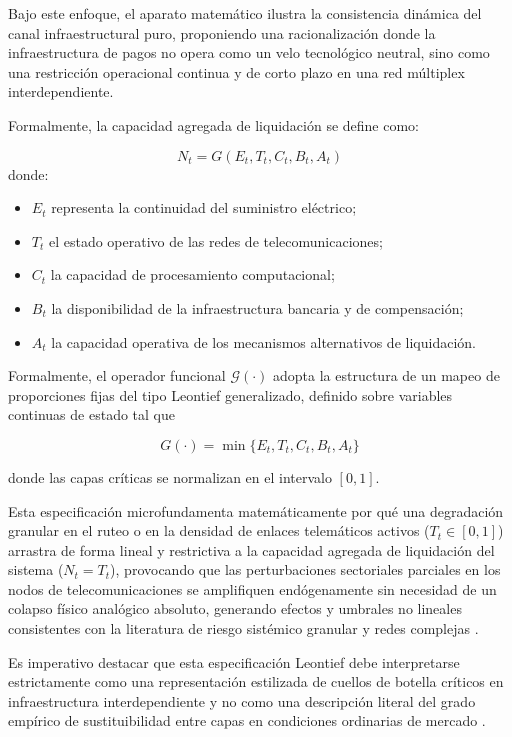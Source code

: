 Bajo este enfoque, el aparato matem\'atico ilustra la consistencia din\'amica del canal infraestructural puro, proponiendo una racionalizaci\'on donde la infraestructura de pagos no opera como un velo tecnol\'ogico neutral, sino como una restricci\'on operacional continua y de corto plazo en una red m\'ultiplex interdependiente.

Formalmente, la capacidad agregada de liquidaci\'on se define como:

\begin{equation}
\label{eq:Nt}
N_t = G(E_t, T_t, C_t, B_t, A_t)
\end{equation}
donde:
\begin{itemize}
    \item $E_t$ representa la continuidad del suministro el\'ectrico;
    \item $T_t$ el estado operativo de las redes de telecomunicaciones;
    \item $C_t$ la capacidad de procesamiento computacional;
    \item $B_t$ la disponibilidad de la infraestructura bancaria y de compensaci\'on;
    \item $A_t$ la capacidad operativa de los mecanismos alternativos de liquidaci\'on.
\end{itemize}

Formalmente, el operador funcional $\mathcal{G}(\cdot)$ adopta la estructura de un mapeo de proporciones fijas del tipo Leontief generalizado, definido sobre variables continuas de estado tal que 

\begin{equation}
G(\cdot) = \min\{E_t, T_t, C_t, B_t, A_t\}
\end{equation}

donde las capas cr\'iticas se normalizan en el intervalo $[0,1]$. 

Esta especificaci\'on microfundamenta matem\'aticamente por qu\'e una degradaci\'on granular en el ruteo o en la densidad de enlaces telem\'aticos activos ($T_t \in [0,1]$) arrastra de forma lineal y restrictiva a la capacidad agregada de liquidaci\'on del sistema ($N_t = T_t$), provocando que las perturbaciones sectoriales parciales en los nodos de telecomunicaciones se amplifiquen end\'ogenamente sin necesidad de un colapso f\'isico anal\'ogico absoluto, generando efectos y umbrales no lineales consistentes con la literatura de riesgo sist\'emico granular y redes complejas \citep{acemoglu2012network, panetta2025systemic}. 

Es imperativo destacar que esta especificaci\'on Leontief debe interpretarse estrictamente como una representaci\'on estilizada de cuellos de botella cr\'iticos en infraestructura interdependiente y no como una descripci\'on literal del grado emp\'irico de sustituibilidad entre capas en condiciones ordinarias de mercado \citep{auer2020technology, kahn2009pay}.

